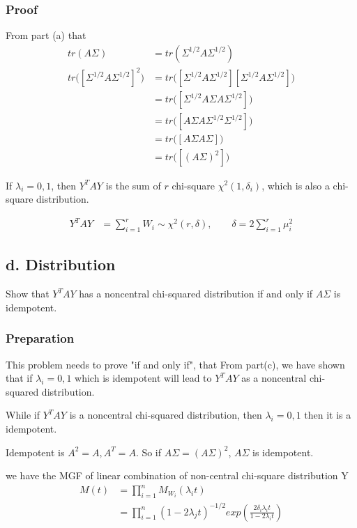 \subsubsection{Proof}
From part (a) that 
\begin{align*}
	tr(A\Sigma) &= tr( \Sigma^{1/2} A \Sigma^{1/2} ) \\
	tr \Big( [\Sigma^{1/2} A \Sigma^{1/2}]^2 \Big) &= tr \Big( [\Sigma^{1/2} A \Sigma^{1/2}] [\Sigma^{1/2} A \Sigma^{1/2}] \Big) \\
	&= tr \Big( [\Sigma^{1/2} A \Sigma A \Sigma^{1/2}] \Big) \\
	&= tr \Big( [ A \Sigma A \Sigma^{1/2} \Sigma^{1/2}] \Big) \\
	&= tr \Big( [ A \Sigma A \Sigma] \Big) \\
	&= tr \Big( [ (A \Sigma)^2 ] \Big) 
\end{align*}


If $\lambda_i = 0, 1$, then $Y^T A Y$ is the sum of $r$ chi-square $\chi^2(1, \delta_i)$, which is also a chi-square distribution.

\begin{align*}
	Y^T A Y &= \sum_{i=1}^r W_i \sim \chi^2 (r, \delta), \qquad \delta = 2 \sum_{i=1}^r \mu_i^2
\end{align*}



\subsection{d. Distribution}
Show that $Y^T A Y$ has a noncentral chi-squared distribution if and only if $A \Sigma$ is idempotent.

\subsubsection{Preparation}
This problem needs to prove "if and only if", that From part(c), we have shown that if $\lambda_i = 0,1$ which is idempotent will lead to $Y^T A Y$ as a noncentral chi-squared distribution. 

While if $Y^T A Y$ is a noncentral chi-squared distribution, then $\lambda_i = 0, 1$ then it is a idempotent. 

Idempotent is $A^2 = A, A^T = A$. So if $A \Sigma = (A \Sigma)^2$, $A \Sigma$ is idempotent. 

we have the MGF of linear combination of non-central chi-square distribution Y
\begin{align*}
	M(t) &= \prod_{i=1}^n M_{W_i}(\lambda_i t)\\
	&=\prod_{i=1}^n  (1-2 \lambda_j t)^{-1/2} exp \left( \frac{ 2 \delta_i \lambda_i t }{1-2 \lambda_i t} \right)
\end{align*}

